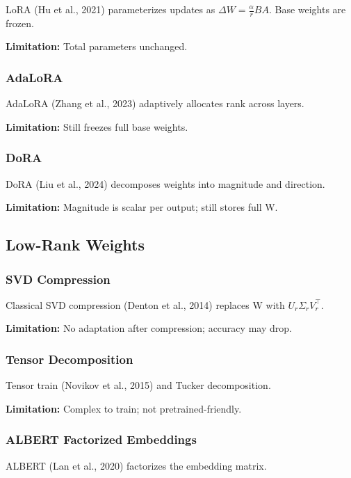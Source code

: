LoRA (Hu et al., 2021) parameterizes updates as $\Delta W = \frac{\alpha}{r} BA$. 
Base weights are frozen.

\textbf{Limitation:} Total parameters unchanged.

\subsubsection{AdaLoRA}

AdaLoRA (Zhang et al., 2023) adaptively allocates rank across layers.

\textbf{Limitation:} Still freezes full base weights.

\subsubsection{DoRA}

DoRA (Liu et al., 2024) decomposes weights into magnitude and direction.

\textbf{Limitation:} Magnitude is scalar per output; still stores full W.

\subsection{Low-Rank Weights}

\subsubsection{SVD Compression}

Classical SVD compression (Denton et al., 2014) replaces W with $U_r \Sigma_r V_r^\top$.

\textbf{Limitation:} No adaptation after compression; accuracy may drop.

\subsubsection{Tensor Decomposition}

Tensor train (Novikov et al., 2015) and Tucker decomposition.

\textbf{Limitation:} Complex to train; not pretrained-friendly.

\subsubsection{ALBERT Factorized Embeddings}

ALBERT (Lan et al., 2020) factorizes the embedding matrix.

